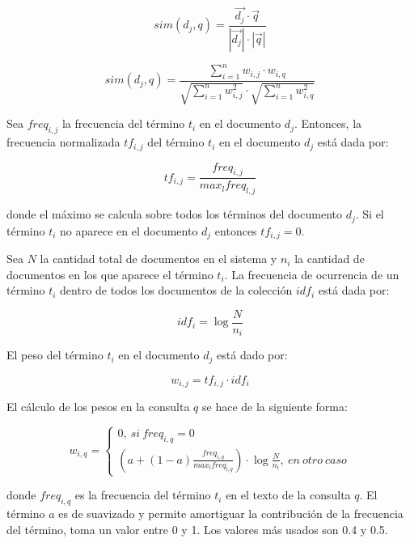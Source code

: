 \documentclass[runningheads]{llncs}
\begin{document}
	\begin{equation}
		sim(d_j,q)=\frac{\overrightarrow{d_j}\cdot\overrightarrow{q}}{|\overrightarrow{d_j}|\cdot|\overrightarrow{q}|}
	\end{equation}

	\begin{equation}	
		sim(d_j,q)=\frac{\sum_{i=1}^{n}w_{i,j}\cdot w_{i,q}}{\sqrt{\sum_{i=1}^{n}w_{i,j}^2}\cdot\sqrt{\sum_{i=1}^{n}w_{i,q}^2}}
	\end{equation}  

	Sea $freq_{i,j}$ la frecuencia del t\'ermino $t_i$ en el documento $d_j$. Entonces, la frecuencia normalizada $tf_{i,j}$ del t\'ermino $t_i$ en el documento $d_j$ est\'a dada por:
	
	\begin{equation}
		tf_{i,j}=\frac{freq_{i,j}}{max_lfreq_{l,j}}
	\end{equation}

	donde el m\'aximo se calcula sobre todos los t\'erminos del documento $d_j$. Si el t\'ermino $t_i$ no aparece en el documento $d_j$ entonces $tf_{i,j}=0$.
	
	Sea $N$ la cantidad total de documentos en el sistema y $n_i$ la cantidad de documentos en los que aparece el t\'ermino $t_i$. La frecuencia de ocurrencia de un t\'ermino $t_i$ dentro de todos los documentos de la colecci\'on $idf_i$ est\'a dada por:
	
	\begin{equation}
		idf_i=\log \frac{N}{n_i}
	\end{equation}

	El peso del t\'ermino $t_i$ en el documento $d_j$ est\'a dado por:
	
	\begin{equation}
		w_{i,j}=tf_{i,j}\cdot idf_i
	\end{equation}

	El c\'alculo de los pesos en la consulta $q$ se hace de la siguiente forma:
	
	\begin{equation}
		w_{i,q}=\left\{\begin{array}{c}
			0,~si~freq_{i,q}=0\\
			\left(a+(1-a)\frac{freq_{i,q}}{max_lfreq_{l,q}}\right)\cdot\log \frac{N}{n_i},~en~otro~caso
		\end{array}\right. 
	\end{equation}

	donde $freq_{i,q}$ es la frecuencia del t\'ermino $t_i$ en el texto de la consulta $q$. El t\'ermino $a$ es de suavizado y permite amortiguar la contribuci\'on de la frecuencia del t\'ermino, toma un valor entre 0 y 1. Los valores m\'as usados son 0.4 y 0.5. 
	
\end{document}

